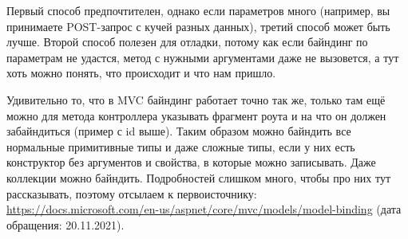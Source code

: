 \documentclass[a5paper]{article}
\begin{document}
Первый способ предпочтителен, однако если параметров много (например, вы принимаете POST-запрос с кучей разных данных), третий способ может быть лучше. Второй способ полезен для отладки, потому как если байндинг по параметрам не удастся, метод с нужными аргументами даже не вызовется, а тут хоть можно понять, что происходит и что нам пришло.

Удивительно то, что в MVC байндинг работает точно так же, только там ещё можно для метода контроллера указывать фрагмент роута и на что он должен забайндиться (пример с id выше). Таким образом можно байндить все нормальные примитивные типы и даже сложные типы, если у них есть конструктор без аргументов и свойства, в которые можно записывать. Даже коллекции можно байндить. Подробностей слишком много, чтобы про них тут рассказывать, поэтому отсылаем к первоисточнику: \url{https://docs.microsoft.com/en-us/aspnet/core/mvc/models/model-binding} (дата обращения: 20.11.2021).
\end{document}
